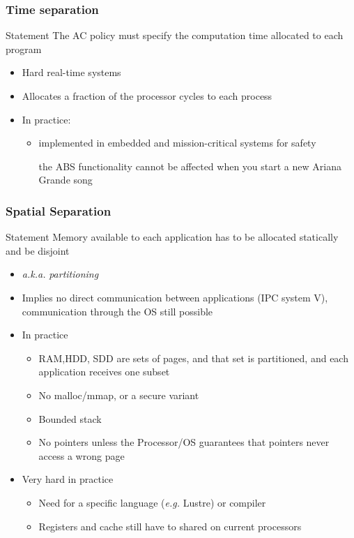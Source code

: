 \begin{reveals}
\begin{frame}
\end{frame}


\begin{frame}
  \frametitle{Time separation}

  \begin{block}{Statement}
    The AC policy must specify the computation time allocated to each
    program
  \end{block}

  \begin{itemize}
  \item Hard real-time systems
  \item Allocates a fraction of the processor cycles to each process
  \item In practice:
    \begin{itemize}
    \item implemented in embedded and mission-critical systems for
      safety
      \begin{center}
        the ABS functionality cannot be affected when you start a new
        Ariana Grande song
      \end{center}
    \end{itemize}
  \end{itemize}

\end{frame}


\begin{frame}
  \frametitle{Spatial Separation}

  \begin{block}{Statement}
    Memory available to each application has to be allocated
    statically and be disjoint
  \end{block}

  \begin{itemize}
  \item \textit{a.k.a.} \emph{partitioning}
  \item Implies no direct communication between applications (IPC
    system V), communication through the OS still possible
  \item In practice
    \begin{itemize}
    \item RAM,HDD, SDD are sets of pages, and that set is partitioned,
      and each application receives one subset
    \item No malloc/mmap, or a secure variant
    \item Bounded stack
    \item No pointers unless the Processor/OS guarantees that pointers
      never access a wrong page
    \end{itemize}
  \item Very hard in practice
    \begin{itemize}
    \item Need for a specific language (\textit{e.g.} Lustre) or compiler
    \item Registers and cache still have to shared on current processors
    \end{itemize}
  \end{itemize}


\end{frame}
\end{reveals}
